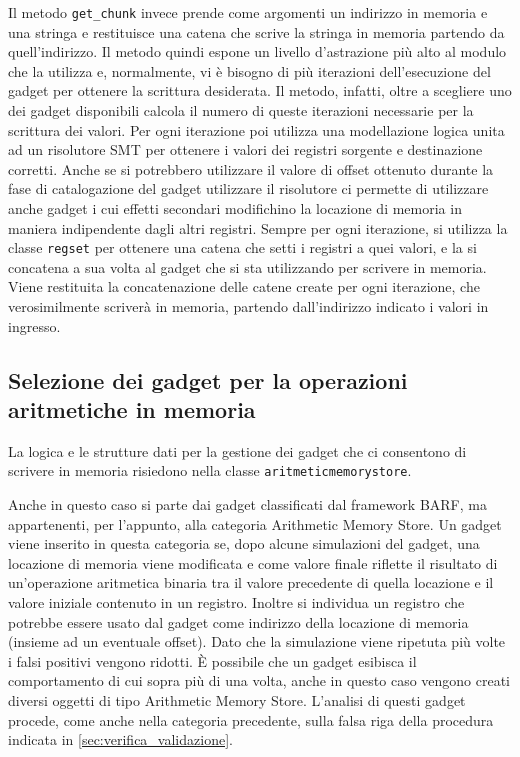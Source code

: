 Il metodo \lstinline{get_chunk} invece prende come argomenti un
indirizzo in memoria e una stringa e restituisce una catena che scrive
la stringa in memoria partendo da quell'indirizzo. Il metodo quindi
espone un livello d'astrazione più alto al modulo che la utilizza e,
normalmente, vi è bisogno di più iterazioni dell'esecuzione del gadget
per ottenere la scrittura desiderata. Il metodo, infatti, oltre a
scegliere uno dei gadget disponibili calcola il numero di queste
iterazioni necessarie per la scrittura dei valori. Per ogni iterazione
poi utilizza una modellazione logica unita ad un risolutore SMT per
ottenere i valori dei registri sorgente e destinazione corretti. Anche
se si potrebbero utilizzare il valore di offset ottenuto durante la
fase di catalogazione del gadget utilizzare il risolutore ci permette
di utilizzare anche gadget i cui effetti secondari modifichino la
locazione di memoria in maniera indipendente dagli altri
registri. Sempre per ogni iterazione, si utilizza la classe
\lstinline{regset} per ottenere una catena che setti i registri a quei
valori, e la si concatena a sua volta al gadget che si sta utilizzando
per scrivere in memoria. Viene restituita la concatenazione delle
catene create per ogni iterazione, che verosimilmente scriverà in
memoria, partendo dall'indirizzo indicato i valori in ingresso.

\subsection{Selezione dei gadget per la operazioni aritmetiche in
  memoria}
\label{sec:arithmeticstore}

La logica e le strutture dati per la gestione dei gadget che ci
consentono di scrivere in memoria risiedono nella classe
\lstinline{aritmeticmemorystore}.

Anche in questo caso si parte dai gadget classificati dal framework
BARF, ma appartenenti, per l'appunto, alla categoria Arithmetic Memory
Store. Un gadget viene inserito in questa categoria se, dopo alcune
simulazioni del gadget, una locazione di memoria viene modificata e
come valore finale riflette il risultato di un'operazione aritmetica
binaria tra il valore precedente di quella locazione e il valore
iniziale contenuto in un registro. Inoltre si individua un registro
che potrebbe essere usato dal gadget come indirizzo della locazione di
memoria (insieme ad un eventuale offset). Dato che la simulazione
viene ripetuta più volte i falsi positivi vengono ridotti. È possibile
che un gadget esibisca il comportamento di cui sopra più di una volta,
anche in questo caso vengono creati diversi oggetti di tipo Arithmetic
Memory Store. L'analisi di questi gadget procede, come anche nella categoria
precedente, sulla falsa riga della procedura indicata in
\ref{sec:verifica_validazione}.

